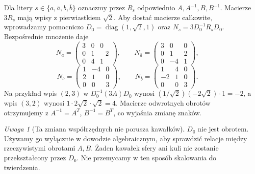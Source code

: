 \documentclass[11pt,a4paper]{article}
\numberwithin{equation}{section}
\theoremstyle{plain}
\theoremstyle{definition}
\theoremstyle{remark}
\newtheorem{uwaga}[twierdzenie]{Uwaga}
\begin{document}
Dla litery $s\in\{a,\bar a,b,\bar b\}$ oznaczmy przez $R_s$ odpowiednio $A,A^{-1},B,B^{-1}$. Macierze $3R_s$ mają wpisy z pierwiastkiem $\sqrt2$. Aby dostać macierze całkowite, wprowadzamy pomocniczo $D_0=\operatorname{diag}(1,\sqrt2,1)$ oraz $N_s=3D_0^{-1}R_sD_0$. Bezpośrednie mnożenie daje
\begin{equation}\label{eq:5-2}
 N_a=\begin{pmatrix}3&0&0\\0&1&-2\\0&4&1\end{pmatrix},\qquad
 N_{\bar a}=\begin{pmatrix}3&0&0\\0&1&2\\0&-4&1\end{pmatrix},
\end{equation}
\begin{equation}\label{eq:5-3}
 N_b=\begin{pmatrix}1&-4&0\\2&1&0\\0&0&3\end{pmatrix},\qquad
 N_{\bar b}=\begin{pmatrix}1&4&0\\-2&1&0\\0&0&3\end{pmatrix}.
\end{equation}
Na przykład wpis $(2,3)$ w $D_0^{-1}(3A)D_0$ wynosi $(1/\sqrt2)(-2\sqrt2)\cdot1=-2$, a wpis $(3,2)$ wynosi $1\cdot2\sqrt2\cdot\sqrt2=4$. Macierze odwrotnych obrotów otrzymujemy z $A^{-1}=A^T$, $B^{-1}=B^T$, co wyjaśnia zmianę znaków.
\begin{uwaga}[Ta zmiana współrzędnych nie porusza kawałków]
$D_0$ nie jest obrotem. Używamy go wyłącznie w dowodzie algebraicznym, aby sprawdzić relacje między rzeczywistymi obrotami $A,B$. Żaden kawałek sfery ani kuli nie zostanie przekształcony przez $D_0$. Nie przemycamy w ten sposób skalowania do twierdzenia.
\end{uwaga}
\end{document}
